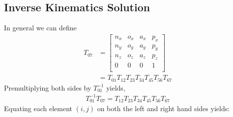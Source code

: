 \documentclass[onecolumn,10pt]{jhwhw}
\begin{document}
\subsection{Inverse Kinematics Solution}
In general we can define
\begin{align*}
T_{07} &=
\left[\begin{matrix}
n_x & o_x & a_x & p_x \\
n_y & o_y & a_y & p_y \\
n_z & o_z & a_z & p_z \\
  0 &   0 &   0 &   1 \\
\end{matrix}\right]\\
&= T_{01} T_{12} T_{23} T_{34} T_{45} T_{56} T_{67}
\end{align*}
Premultiplying both sides by $T_{01}^{-1}$ yields,
\begin{align*}
T_{01}^{-1} T_{07} = T_{12} T_{23} T_{34} T_{45} T_{56} T_{67}
\end{align*}
Equating each element $(i,j)$ on both the left and right hand sides yields:
\end{document}
